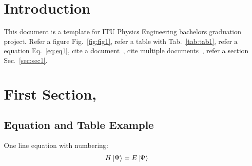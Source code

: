 ﻿\documentclass[12pt]{article}
\begin{document}

\onehalfspacing



\section*{}
\justifying

 
\clearpage



\section*{}
\justifying 


\clearpage


\renewcommand\contentsname{CONTENTS} 
\begingroup
    \let\clearpage\relax
    \tableofcontents
\endgroup
{}
\clearpage




\onehalfspacing

\section{Introduction}
This document is a template for ITU Physics Engineering bachelors graduation project. Refer a figure Fig.~\ref{fig:fig1}, refer a table with Tab.~\ref{tab:tab1}, refer a equation Eq.~\ref{eq:eq1}, cite a document~\cite{sakurai_modern_2010}, cite multiple documents~\cite{sakurai_modern_2010,kramer_quantumopticsjl_2018,baumgratz_quantifying_2014,verstraete_matrix_2008}, refer a section Sec.~\ref{sec:sec1}.



\section{First Section,\label{sec:sec1}}

\subsection{Equation and Table Example}
One line equation with numbering:
\begin{equation}
    H\ket{\Psi}=E\ket{\Psi}
    \label{eq:eq1}
\end{equation}
\end{document}
